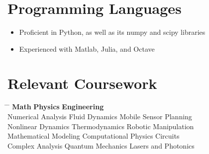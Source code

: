 \documentclass[12pt]{res}
\begin{document}
\begin{resume}
	\section{Programming Languages}
	\noindent
	\begin{itemize}
	\item Proficient in Python, as well as its numpy and scipy libraries
	\item Experienced with Matlab, Julia, and Octave
	\end{itemize}

  \section{Relevant Coursework}
    \vspace{-5pt}
    \begin{tabbing}
      \hspace{2.3in} \= \hspace{2.3in} \= \kill
      {\bf Math}         \> {\bf Physics}      \> {\bf Engineering} \\
      Numerical Analysis \> Fluid Dynamics \> Mobile Sensor Planning \\
      Nonlinear Dynamics \> Thermodynamics \> Robotic Manipulation\\ 
      Mathematical Modeling \> Computational Physics \> Circuits  \\
      Complex Analysis \> Quantum Mechanics \> Lasers and Photonics\\
    \end{tabbing}

\end{resume}
\end{document}
